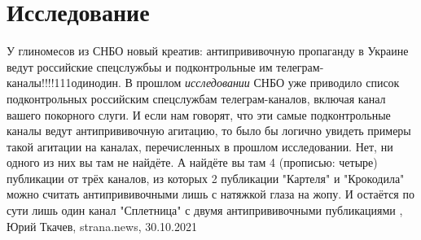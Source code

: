  
 
 
 
 
\chapter{Исследование}
\label{sec:slova.issledovanie}

У глиномесов из СНБО новый креатив: антипрививочную пропаганду в Украине ведут
российские спецслужбьы и подконтрольные им телеграм-каналы!!!!111одинодин.  В
прошлом \emph{исследовании} СНБО уже приводило список подконтрольных российским
спецслужбам телеграм-каналов, включая канал вашего покорного слуги. И если нам
говорят, что эти самые подконтрольные каналы ведут антипрививочную агитацию, то
было бы логично увидеть примеры такой агитации на каналах, перечисленных в
прошлом исследовании. Нет, ни одного из них вы там не найдёте.  А найдёте вы
там 4 (прописью: четыре) публикации от трёх каналов, из которых 2 публикации
"Картеля" и "Крокодила" можно считать антипрививочными лишь с натяжкой глаза на
жопу. И остаётся по сути лишь один канал "Сплетница" с двумя антипрививочными
публикациями
, 
Юрий Ткачев, strana.news, 30.10.2021
